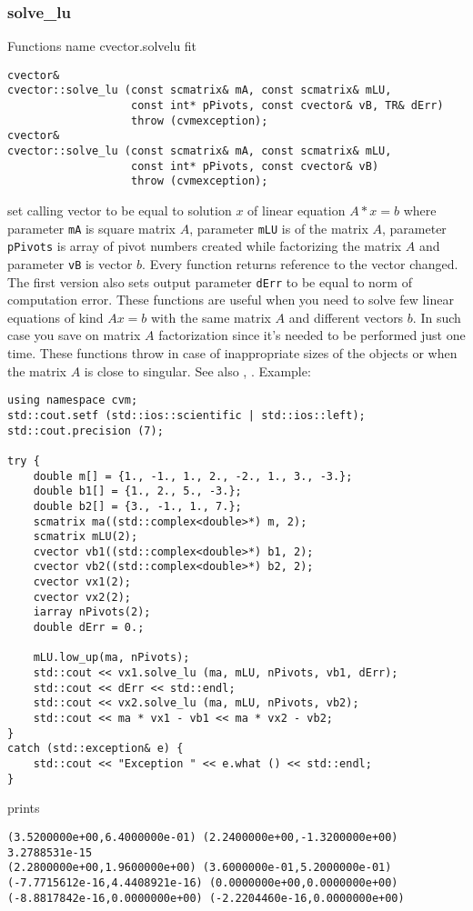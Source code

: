 \subsubsection{solve\_lu}
Functions%
\pdfdest name {cvector.solvelu} fit
\begin{verbatim}
cvector&
cvector::solve_lu (const scmatrix& mA, const scmatrix& mLU,
                   const int* pPivots, const cvector& vB, TR& dErr)
                   throw (cvmexception);
cvector&
cvector::solve_lu (const scmatrix& mA, const scmatrix& mLU,
                   const int* pPivots, const cvector& vB)
                   throw (cvmexception);
\end{verbatim}
set  calling vector to be equal to  solution $x$ of linear equation
$A*x=b$ where parameter \verb"mA" is  square matrix $A$,
parameter \verb"mLU" is 
of the matrix $A$, parameter \verb"pPivots" is  array of pivot numbers
created while factorizing the matrix $A$
and parameter \verb"vB" is  vector $b$.
Every function returns  reference to the vector changed.
The first version also sets output parameter \verb"dErr" to be equal
to  norm of computation error.
These functions are useful when you need to solve few linear equations
of kind $Ax=b$ with the same matrix $A$ and different vectors $b$.
In such case you save on matrix $A$ factorization since it's needed to be
performed just one time.
These functions throw 
in case of inappropriate sizes
of the objects or when the matrix $A$ is close to singular.
See also , .
Example:
\begin{Verbatim}
using namespace cvm;
std::cout.setf (std::ios::scientific | std::ios::left);
std::cout.precision (7);

try {
    double m[] = {1., -1., 1., 2., -2., 1., 3., -3.};
    double b1[] = {1., 2., 5., -3.};
    double b2[] = {3., -1., 1., 7.};
    scmatrix ma((std::complex<double>*) m, 2);
    scmatrix mLU(2);
    cvector vb1((std::complex<double>*) b1, 2);
    cvector vb2((std::complex<double>*) b2, 2);
    cvector vx1(2);
    cvector vx2(2);
    iarray nPivots(2);
    double dErr = 0.;

    mLU.low_up(ma, nPivots);
    std::cout << vx1.solve_lu (ma, mLU, nPivots, vb1, dErr);
    std::cout << dErr << std::endl;
    std::cout << vx2.solve_lu (ma, mLU, nPivots, vb2);
    std::cout << ma * vx1 - vb1 << ma * vx2 - vb2;
}
catch (std::exception& e) {
    std::cout << "Exception " << e.what () << std::endl;
}
\end{Verbatim}
prints
\begin{Verbatim}
(3.5200000e+00,6.4000000e-01) (2.2400000e+00,-1.3200000e+00)
3.2788531e-15
(2.2800000e+00,1.9600000e+00) (3.6000000e-01,5.2000000e-01)
(-7.7715612e-16,4.4408921e-16) (0.0000000e+00,0.0000000e+00)
(-8.8817842e-16,0.0000000e+00) (-2.2204460e-16,0.0000000e+00)
\end{Verbatim}
\newpage



